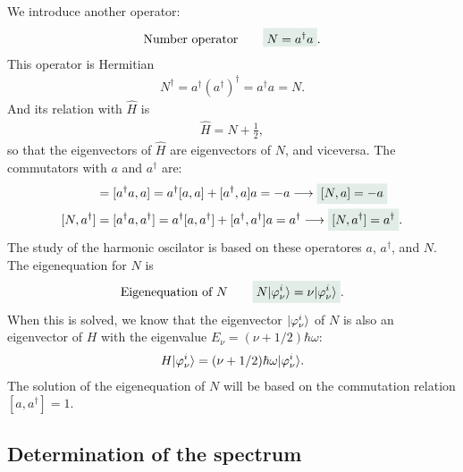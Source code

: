 We introduce another operator:
\begin{align}
    \text{Number operator}\qquad\highlight{N=a^\dagger a}.
\end{align}
This operator is Hermitian 
\begin{align*}
    N^\dagger=a^\dagger(a^\dagger)^\dagger=a^\dagger a=N.
\end{align*}
And its relation with $\hat{H}$ is 
\begin{align}
    \hat{H}=N+\frac{1}{2},
\end{align}
so that the eigenvectors of $\hat{H}$ are eigenvectors of $N$, and viceversa. The commutators with $a$ and $a^\dagger$ are:
\begin{align}
    [N,a]&=[a^\dagger a,a]=a^\dagger[a,a]+[a^\dagger,a]a=-a\longrightarrow\highlight{[N,a]=-a}\\
    [N,a^\dagger]&=[a^\dagger a,a^\dagger]=a^\dagger[a,a^\dagger]+[a^\dagger,a^\dagger]a=a^\dagger\longrightarrow\highlight{[N,a^\dagger]=a^\dagger}.
\end{align}
The study of the harmonic oscilator is based on these operatores $a$, $a^\dagger$, and $N$. The eigenequation for $N$ is 
\begin{align}
    \text{Eigenequation of $N$}\qquad\highlight{N\ket{\varphi_\nu^i}=\nu\ket{\varphi_\nu^i}}.
\end{align}
When this is solved, we know that the eigenvector $|\varphi_\nu^i\rangle$ of $N$ is also an eigenvector of $H$ with the eigenvalue $E_\nu=(\nu+1/2)\hbar\omega$:
\begin{align}
    H|\varphi_\nu^i\rangle=(\nu+1/2)\hbar\omega|\varphi_\nu^i\rangle.
\end{align}
The solution of the eigenequation of $N$ will be based on the commutation relation $[a,a^\dagger]=1$.

%
\subsection{Determination of the spectrum}
